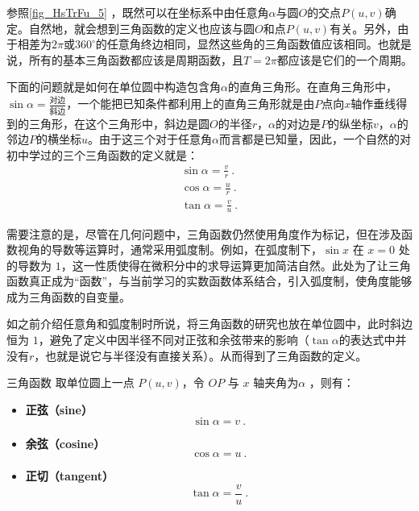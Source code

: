 参照\autoref{fig_HsTrFu_5} ，既然可以在坐标系中由任意角$\alpha$与圆$O$的交点$P(u,v)$确定。自然地，就会想到三角函数的定义也应该与圆$O$和点$P(u,v)$有关。另外，由于相差为$2\pi$或$360^\circ$的任意角终边相同，显然这些角的三角函数值应该相同。也就是说，所有的基本三角函数都应该是周期函数，且$T=2\pi$都应该是它们的一个周期。

下面的问题就是如何在单位圆中构造包含角$\alpha$的直角三角形。在直角三角形中，$\displaystyle\sin\alpha = \frac{\text{对边}}{\text{斜边}}$，一个能把已知条件都利用上的直角三角形就是由$P$点向$x$轴作垂线得到的三角形，在这个三角形中，斜边是圆$O$的半径$r$，$\alpha$的对边是$P$的纵坐标$v$，$\alpha$的邻边$P$的横坐标$u$。由于这三个对于任意角$\alpha$而言都是已知量，因此，一个自然的对初中学过的三个三角函数的定义就是：
\begin{gather}
\sin\alpha = \frac{v}{r}~.\\
\cos\alpha = \frac{u}{r}~.\\
\tan\alpha = \frac{v}{u}~.
\end{gather}


需要注意的是，尽管在几何问题中，三角函数仍然使用角度作为标记，但在涉及函数视角的导数等运算时，通常采用弧度制。例如，在弧度制下，$\sin x$ 在 $x=0$ 处的导数为 $1$，这一性质使得在微积分中的求导运算更加简洁自然。此处为了让三角函数真正成为“函数”，与当前学习的实数函数体系结合，引入弧度制，使角度能够成为三角函数的自变量。

如之前介绍任意角和弧度制时所说，将三角函数的研究也放在单位圆中，此时斜边恒为 $1$，避免了定义中因半径不同对正弦和余弦带来的影响（$\tan\alpha$的表达式中并没有$r$，也就是说它与半径没有直接关系）。从而得到了三角函数的定义。

\begin{definition}{三角函数}
取单位圆上一点 $P(u,v)$，令 $OP$ 与 $x$ 轴夹角为$\alpha$ ，则有：
\begin{itemize}
\item \textbf{正弦（sine）}
\begin{equation}
\displaystyle\sin \alpha = v~.
\end{equation}
\item \textbf{余弦（cosine）}
\begin{equation}
\displaystyle\cos \alpha = u~.
\end{equation}
\item \textbf{正切（tangent）}
\begin{equation}
\displaystyle\tan \alpha = \frac{v}{u}~.
\end{equation}
\end{itemize}
\end{definition}


